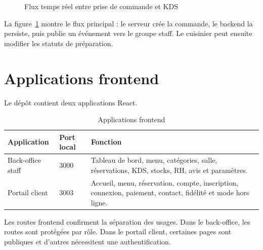\begin{figure}[H]
\centering
{}
\caption{Flux temps réel entre prise de commande et KDS}
\label{fig:flux-kds}
\end{figure}

La figure~\ref{fig:flux-kds} montre le flux principal : le serveur crée la commande, le backend la persiste, puis publie un événement vers le groupe staff. Le cuisinier peut ensuite modifier les statuts de préparation.

\section{Applications frontend}
Le dépôt contient deux applications React.

\begin{table}[H]
\centering
\caption{Applications frontend}
\label{tab:frontends}
\begin{tabularx}{\textwidth}{p{3.3cm}p{3cm}Y}
\toprule
\textbf{Application} & \textbf{Port local} & \textbf{Fonction} \\
\midrule
Back-office staff & 3000 & Tableau de bord, menu, catégories, salle, réservations, KDS, stocks, RH, avis et paramètres. \\
Portail client & 3003 & Accueil, menu, réservation, compte, inscription, connexion, paiement, contact, fidélité et mode hors ligne. \\
\bottomrule
\end{tabularx}
\end{table}

Les routes frontend confirment la séparation des usages. Dans le back-office, les routes sont protégées par rôle. Dans le portail client, certaines pages sont publiques et d'autres nécessitent une authentification.


